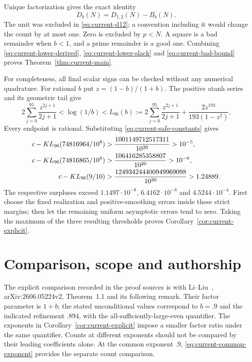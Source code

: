 Unique factorization gives the exact identity
\begin{equation}
                         D_b(N)=D_{1,2}(N)-B_b(N).
 \label{eq:current-exact-subtraction}
\end{equation}
The unit was excluded in \eqref{eq:current-d12}; a convention
including it would change the count by at most one.  Zero is
excluded by $p<N$.  A square is a bad remainder when $b<1$, and
a prime remainder is a good one.  Combining
\eqref{eq:current-lower-derived}, \eqref{eq:current-lower-slack}
and \eqref{eq:current-bad-bound} proves
Theorem~\ref{thm:current-main}.

For completeness, all final scalar signs can be checked without
any numerical quadrature.  For rational $b$ put $z=(1-b)/(1+b)$.
The positive atanh series and its geometric tail give
\begin{equation}
 2\sum_{j=0}^{95}\frac{z^{2j+1}}{2j+1}
 <\log(1/b)
 <L_{96}(b):=
 2\sum_{j=0}^{95}\frac{z^{2j+1}}{2j+1}
       +\frac{2z^{193}}{193(1-z^2)}.
 \label{eq:current-log-certificate}
\end{equation}
Every endpoint is rational.  Substituting
\eqref{eq:current-safe-constants} gives
\begin{align}
 c-KL_{96}(74816964/10^8)
     &>\frac{1001149712517311}{10^{20}}>10^{-5},\notag\\
 c-KL_{96}(74816865/10^8)
     &>\frac{106416285358807}{10^{20}}>10^{-6},
                 \label{eq:current-rational-margins}\\
 c-KL_{96}(9/10)
     &>\frac{124934244400949969098}{10^{20}}>1.24889.\notag
\end{align}
The respective surpluses exceed
$1.1497\cdot10^{-8}$, $6.4162\cdot10^{-8}$ and
$4.5244\cdot10^{-4}$.  First choose the fixed realization and
positive-smoothing errors inside these strict margins; then let
the remaining uniform asymptotic errors tend to zero.  Taking the
maximum of the three resulting thresholds proves
Corollary~\ref{cor:current-explicit}.

\section{Comparison, scope and authorship}
\label{sec:current-scope}

The explicit comparison recorded in the proof sources is with
Li--Liu~\cite{LiLiu}, arXiv:2606.05224v2, Theorem~1.1 and its following remark.
Their factor parameter is $1+b$; the stated unconditional values
correspond to $b=.9$ and the indicated refinement $.894$, with
the all-sufficiently-large-even quantifier.  The exponents in
Corollary~\ref{cor:current-explicit} impose a smaller factor ratio
under the same quantifier.  Counts at different exponents should
not be compared by their leading coefficients alone.  At the
common exponent $.9$, \eqref{eq:current-common-exponent} provides
the separate count comparison.

